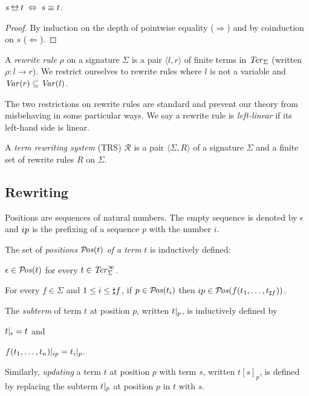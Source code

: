 \begin{proposition}\label{prop:equalities}
$s \bis t \; \Leftrightarrow \; s \equiv t$.
\end{proposition}
\begin{proof}
By induction on the depth of pointwise equality ($\Rightarrow$) and
by coinduction on $s$ ($\Leftarrow$).
\end{proof}

\begin{definition}%
  A \emph{rewrite rule} $\rho$ on a signature $\Sigma$ is a pair
  $\langle l, r \rangle$ of finite terms in $\mathit{Ter}_\Sigma$ (written $\rho : l
  \rightarrow r$). We restrict ourselves to rewrite rules where $l$ is
  not a variable and $\mathit{Var}(r) \subseteq \mathit{Var}(l)$.
\end{definition}

The two restrictions on rewrite rules are standard and prevent our
theory from misbehaving in some particular ways. We say a rewrite rule
is \emph{left-linear} if its left-hand side is linear.

\begin{definition}%
A \emph{term rewriting system} (TRS) $\mathcal{R}$ is a pair $\langle \Sigma,
R \rangle$ of a signature $\Sigma$ and a finite set of rewrite rules
$R$ on $\Sigma$.
\end{definition}


\subsection{Rewriting}

Positions are sequences of natural numbers. The empty sequence is
denoted by $\epsilon$ and $i p$ is the prefixing of a
sequence $p$ with the number $i$.

\begin{definition}%
  The set of \emph{positions} $\mathcal{P}\!\mathit{os}(t)$ \emph{of a term} $t$ is
  inductively defined:
  \begin{compactenum}
    \item $\epsilon \in \mathcal{P}\!\mathit{os}(t)$ for every $t \in \mathit{Ter}_\Sigma^\infty$.
    \item For every $f \in \Sigma$ and $1 \le i \le \sharp f$, if $p
      \in \mathcal{P}\!\mathit{os}(t_i)$ then $i p \in \mathcal{P}\!\mathit{os}(f(t_1, \ldots,
      t_{\sharp f}))$.
  \end{compactenum}
  The \emph{subterm} of term $t$ at position $p$, written
  $t |_{p}$, is inductively defined by
  \begin{inparaenum}[(i)]
    \item $t |_{\epsilon} = t$ and
    \item $f(t_1, \ldots, t_n) |_{i p} =
      t_i |_{p}$.
  \end{inparaenum}
  Similarly, \emph{updating} a term $t$ at position $p$ with term $s$,
  written $t[s]_p$, is defined by replacing the subterm
  $t |_{p}$ at position $p$ in $t$ with $s$.
\end{definition}

